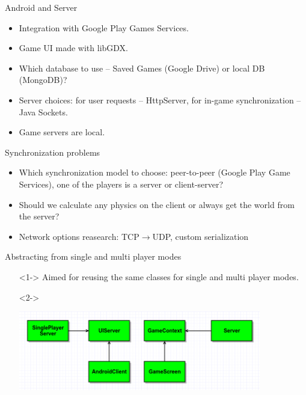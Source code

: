 \documentclass[12pt]{beamer}
\begin{document}
\begin{frame} {Android and Server}
    \begin{itemize}
        \item <1-> Integration with Google Play Games Services.
        \item <2-> Game UI made with libGDX.
        \item <3-> Which database to use -- Saved Games (Google Drive) or local DB (MongoDB)?
        \item <4-> Server choices: for user requests -- HttpServer, for in-game synchronization -- Java Sockets.
        \item <5-> Game servers are local.
    \end{itemize}
\end{frame}


\begin{frame} {Synchronization problems}
    \begin{itemize}
    	\item <1-> Which synchronization model to choose: peer-to-peer (Google Play Game Services), one of the players is a server or client-server?
	    \item <2-> Should we calculate any physics on the client or always get the world from the server?
	    \item <3-> Network options reasearch: TCP$\rightarrow$UDP, custom serialization
    \end{itemize}
\end{frame}


\begin{frame} {Abstracting from single and multi player modes}
    \begin{itemize}
        \item[] <1-> Aimed for reusing the same classes for single and multi player modes.
        \item[] <2-> \begin{center} \includegraphics[width=300pt]{singleplayer.png} \end{center}
    \end{itemize}
\end{frame}
\end{document}
